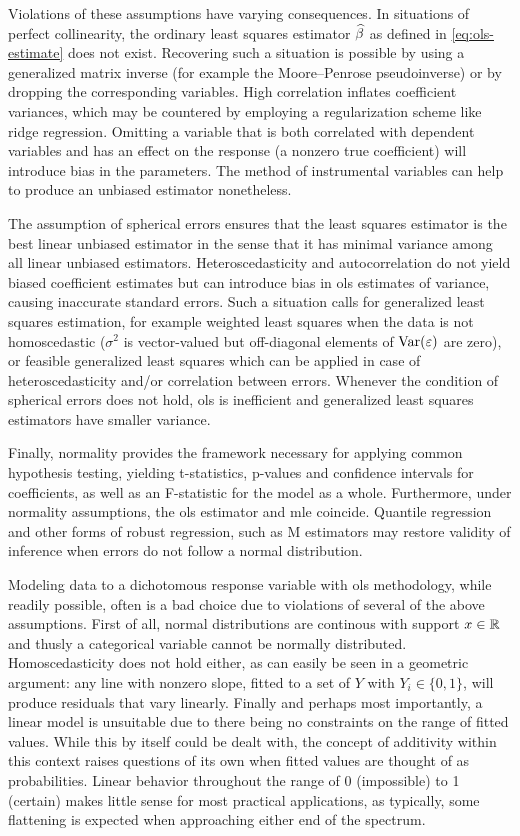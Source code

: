 Violations of these assumptions have varying consequences. In situations of perfect collinearity, the ordinary least squares estimator $\widehat{\beta}$ as defined in \eqref{eq:ols-estimate} does not exist. Recovering such a situation is possible by using a generalized matrix inverse (for example the Moore--Penrose pseudoinverse) or by dropping the corresponding variables. High correlation inflates coefficient variances, which may be countered by employing a regularization scheme like ridge regression. Omitting a variable that is both correlated with dependent variables and has an effect on the response (a nonzero true coefficient) will introduce bias in the parameters. The method of instrumental variables can help to produce an unbiased estimator nonetheless.

The assumption of spherical errors ensures that the least squares estimator is the best linear unbiased estimator in the sense that it has minimal variance among all linear unbiased estimators. Heteroscedasticity and autocorrelation do not yield biased coefficient estimates but can introduce bias in \gls{ols} estimates of variance, causing inaccurate standard errors. Such a situation calls for generalized least squares estimation, for example weighted least squares when the data is not homoscedastic ($\sigma^2$ is vector-valued but off-diagonal elements of $\operatorname{Var}(\varepsilon)$ are zero), or feasible generalized least squares which can be applied in case of heteroscedasticity and\slash or correlation between errors. Whenever the condition of spherical errors does not hold, \gls{ols} is inefficient and generalized least squares estimators have smaller variance.

Finally, normality provides the framework necessary for applying common hypothesis testing, yielding t-statistics, p-values and confidence intervals for coefficients, as well as an F-statistic for the model as a whole. Furthermore, under normality assumptions, the \gls{ols} estimator and \gls{mle} coincide. Quantile regression and other forms of robust regression, such as M estimators may restore validity of inference when errors do not follow a normal distribution.

Modeling data to a dichotomous response variable with \gls{ols} methodology, while readily possible, often is a bad choice due to violations of several of the above assumptions. First of all, normal distributions are continous with support $x \in \mathbb{R}$ and thusly a categorical variable cannot be normally distributed. Homoscedasticity does not hold either, as can easily be seen in a geometric argument: any line with nonzero slope, fitted to a set of $Y$ with $Y_i \in \{0,1\}$, will produce residuals that vary linearly. Finally and perhaps most importantly, a linear model is unsuitable due to there being no constraints on the range of fitted values. While this by itself could be dealt with, the concept of additivity within this context raises questions of its own when fitted values are thought of as probabilities. Linear behavior throughout the range of 0 (impossible) to 1 (certain) makes little sense for most practical applications, as typically, some flattening is expected when approaching either end of the spectrum.

